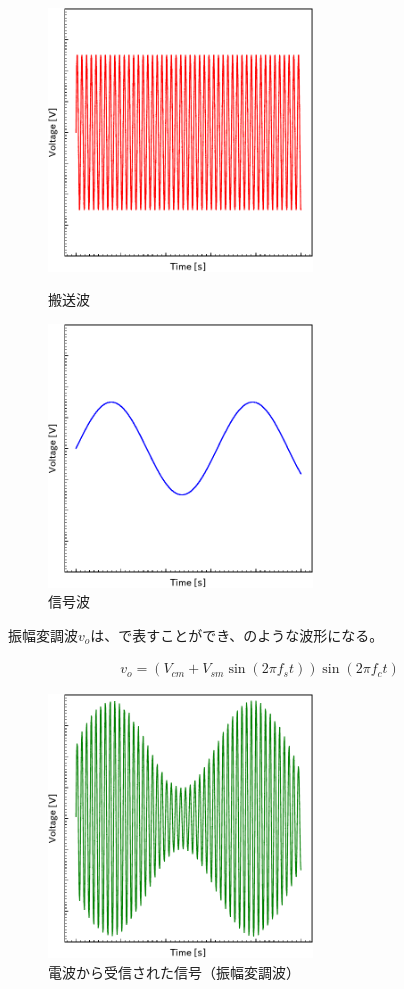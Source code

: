 \documentclass[report.tex]{subfiles}
\begin{document}
\begin{figure}[H]
	\begin{minipage}[b]{0.5\columnwidth}
		\centering
		\includegraphics[width=7cm]{fig/5V.pdf}
		\caption{搬送波}
		\label{fig:5V}
	\end{minipage}
	\begin{minipage}[b]{0.5\columnwidth}
		\centering
		\includegraphics[width=7cm]{fig/3V.pdf}
		\caption{信号波}
		\label{fig:3V}
	\end{minipage}
\end{figure}

振幅変調波\(v_o\)は、で表すことができ、のような波形になる。

\begin{align}
	v_o = (V_{cm} + V_{sm} \sin(2 \pi f_s t)) \sin(2 \pi f_c t) \label{eq:v_o}
\end{align}

\begin{figure}[H]
	\centering
	\includegraphics[width=7cm]{fig/Wave.pdf}
	\caption{電波から受信された信号（振幅変調波）}
	\label{fig:wave}
\end{figure}
\end{document}
